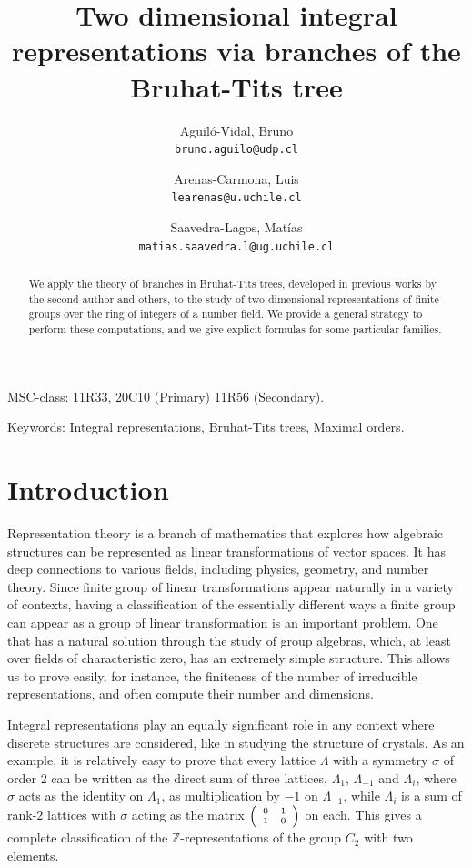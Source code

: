 \documentclass{article}
\title{Two dimensional integral representations via branches of the Bruhat-Tits tree}
\author{
  Aguil\'o-Vidal, Bruno\\
  \texttt{bruno.aguilo@udp.cl}
  \and
    Arenas-Carmona, Luis\\
  \texttt{learenas@u.uchile.cl}
  \and
  Saavedra-Lagos, Mat\'ias\\
  \texttt{matias.saavedra.l@ug.uchile.cl}
}
\theoremstyle{definition}
\theoremstyle{remark}
\newcommand\sbmattrix[4]{\textnormal{\scriptsize$\left(\begin{array}{cc}#1&#2\\#3&#4\end{array}\right)$\normalsize}}
\begin{document}
\maketitle

\begin{abstract}
We apply the theory of branches in Bruhat-Tits trees, developed in previous 
works by the second author and others, to the study of two 
dimensional representations of finite groups over the ring of integers
of a number field. We provide a general strategy to perform these 
computations, and we give explicit formulas for some particular families.
\end{abstract}

MSC-class: 11R33, 20C10 (Primary)  11R56 (Secondary).

Keywords: Integral representations, Bruhat-Tits trees, Maximal orders.
\section{Introduction}

Representation theory is a branch of mathematics that explores how
algebraic structures can be represented as linear transformations of vector
spaces. It has deep connections to various fields, 
including physics, geometry, and number theory.
Since finite group of linear transformations appear naturally in a 
variety of contexts, having a classification of the essentially different
ways a finite group can appear as a group of linear transformation
is an important problem. One that has a natural solution through
the study of group algebras, which, at least over fields of characteristic 
zero, has an extremely simple structure. This allows us to prove easily,
for instance, the finiteness of the number of irreducible representations,
and often compute their number and dimensions. 

Integral representations play an equally significant role in any context 
where discrete structures are considered, like in studying the structure of 
crystals. 
As an example, it is relatively easy to prove that every lattice $\Lambda$
with a symmetry $\sigma$ of order $2$ can be written as the direct sum 
of three lattices, $\Lambda_1$, $\Lambda_{-1}$ and $\Lambda_i$,
where $\sigma$ acts as the identity on $\Lambda_1$, as multiplication by 
$-1$ on $\Lambda_{-1}$, while $\Lambda_i$ is a sum of rank-$2$ lattices
with $\sigma$ acting as the matrix $\sbmattrix 0110$ on each. This gives
a complete classification of the $\mathbb{Z}$-representations of
the group $C_2$ with two elements.
\end{document}
